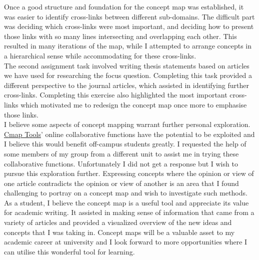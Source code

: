 \documentclass[12pt,a4paper]{report}
\begin{document}
Once a good structure and foundation for the concept map was established, it was easier to identify cross-links between different sub-domains. The difficult part was deciding which cross-links were most important, and deciding how to present those links with so many lines intersecting and overlapping each other. This resulted in many iterations of the map, while I attempted to arrange concepts in a hierarchical sense while accommodating for these cross-links.\\

The second assignment task involved writing thesis statements based on articles we have used for researching the focus question. Completing this task provided a different perspective to the journal articles, which assisted in identifying further cross-links. Completing this exercise also highlighted the most important cross-links which motivated me to redesign the concept map once more to emphasise those links.\\

I believe some aspects of concept mapping warrant further personal exploration. \href{http://cmap.ihmc.us/}{Cmap Tools}' online collaborative functions have the potential to be exploited and I believe this would benefit off-campus students greatly. I requested the help of some members of my group from a different unit to assist me in trying these collaborative functions. Unfortunately I did not get a response but I wish to pursue this exploration further. Expressing concepts where the opinion or view of one article contradicts the opinion or view of another is an area that I found challenging to portray on a concept map and wish to investigate such methods.\\

As a student, I believe the concept map is a useful tool and appreciate its value for academic writing. It assisted in making sense of information that came from a variety of articles and provided a visualized overview of the new ideas and concepts that I was taking in. Concept maps will be a valuable asset to my academic career at university and I look forward to more opportunities where I can utilise this wonderful tool for learning.

\newpage
{}


\end{document}
